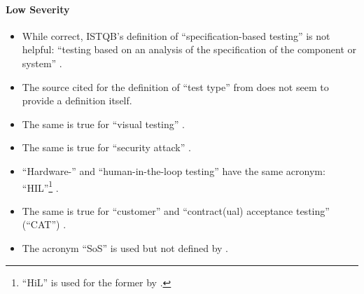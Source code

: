\ifnotpaper
      \paragraph{Low Severity}
      \begin{itemize}
            \item While correct, ISTQB's definition of ``specification-based testing''
                  is not helpful: ``testing based on an analysis of the specification
                  of the component or system'' \citepISTQB{}.
            \item The source cited for the definition of ``test type'' from
                  \citepISTQB{} does not seem to provide a definition itself.
            \item The same is true for ``visual testing'' \citepISTQB{}.
            \item The same is true for ``security attack'' \citepISTQB{}.
            \item ``Hardware-'' and ``human-in-the-loop testing'' have the same
                  acronym: ``HIL''\footnote{``HiL'' is used for the former by
                        \citet[p.~2]{PreußeEtAl2012}.} \citep[p.~23]{Firesmith2015}.
            \item The same is true for ``customer'' and ``contract(ual) acceptance
                  testing'' (``CAT'') \citep[p.~30]{Firesmith2015}.
            \item The acronym ``SoS'' is used but not defined by
                  \citet[p.~23]{Firesmith2015}.
      \end{itemize}\fi